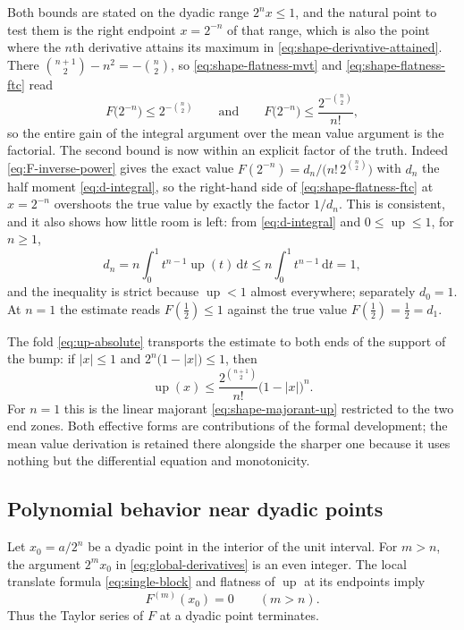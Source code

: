 \documentclass[11pt,oneside]{article}
\theoremstyle{definition}
\theoremstyle{remark}
\newcommand{\Up}{\operatorname{up}}
\newcommand{\dd}{\,\mathrm d}
\begin{document}
Both bounds are stated on the dyadic range $2^nx\le1$, and the natural point to test them is
the right endpoint $x=2^{-n}$ of that range, which is also the point where the $n$th
derivative attains its maximum in \eqref{eq:shape-derivative-attained}.  There
$\binom{n+1}{2}-n^2=-\binom n2$, so \eqref{eq:shape-flatness-mvt} and
\eqref{eq:shape-flatness-ftc} read
\begin{equation}
 F\bigl(2^{-n}\bigr)\le2^{-\binom n2}
 \qquad\text{and}\qquad
 F\bigl(2^{-n}\bigr)\le\frac{2^{-\binom n2}}{n!},         \label{eq:shape-flatness-at-dyadic}
\end{equation}
so the entire gain of the integral argument over the mean value argument is the factorial.
The second bound is now within an explicit factor of the truth.  Indeed
\eqref{eq:F-inverse-power} gives the exact value $F(2^{-n})=d_n/\bigl(n!\,2^{\binom n2}\bigr)$
with $d_n$ the half moment \eqref{eq:d-integral}, so the right-hand side of
\eqref{eq:shape-flatness-ftc} at $x=2^{-n}$ overshoots the true value by exactly the factor
$1/d_n$.  This is consistent, and it also shows how little room is left: from
\eqref{eq:d-integral} and $0\le\Up\le1$, for $n\ge1$,
\[
 d_n=n\int_0^1t^{n-1}\Up(t)\dd t\le n\int_0^1t^{n-1}\dd t=1,
\]
and the inequality is strict because $\Up<1$ almost everywhere; separately $d_0=1$.  At
$n=1$ the estimate reads $F(\tfrac12)\le1$ against the true
value $F(\tfrac12)=\tfrac12=d_1$.

The fold \eqref{eq:up-absolute} transports the estimate to both ends of the support of the
bump: if $|x|\le1$ and $2^{n}\bigl(1-|x|\bigr)\le1$, then
\begin{equation}
 \Up(x)\le\frac{2^{\binom{n+1}{2}}}{n!}\bigl(1-|x|\bigr)^{n}.  \label{eq:shape-flatness-up}
\end{equation}
For $n=1$ this is the linear majorant \eqref{eq:shape-majorant-up} restricted to the two end
zones.  Both effective forms are contributions of the formal development; the mean value
derivation is retained there alongside the sharper one because it uses nothing but the
differential equation and monotonicity.

\subsection{Polynomial behavior near dyadic points}

Let $x_0=a/2^n$ be a dyadic point in the interior of the unit interval.  For $m>n$, the
argument $2^m x_0$ in \eqref{eq:global-derivatives} is an even integer.  The local translate
formula \eqref{eq:single-block} and flatness of $\Up$ at its endpoints imply
\begin{equation}
 F^{(m)}(x_0)=0\qquad(m>n).                                \label{eq:dyadic-high-derivatives-zero}
\end{equation}
Thus the Taylor series of $F$ at a dyadic point terminates.
\end{document}
